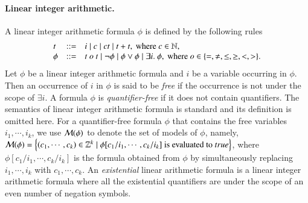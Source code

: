 \paragraph*{Linear integer arithmetic.}  A linear integer arithmetic formula $\phi$ is defined by the following rules
\[
\begin{array}{l c l}
t & ::=  & i \mid c \mid ct \mid t + t, \mbox{ where } c \in \mathbb{N}, \\
\phi &::= & t \ o \ t \mid \neg \phi \mid \phi \vee \phi \mid \exists i.\ \phi, \mbox{ where } o \in \{=, \neq, \le, \ge, <, >\}.
\end{array}
\]
Let $\phi$ be a linear integer arithmetic formula and $i$ be a variable occurring in $\phi$. Then an occurrence of $i$ in $\phi$ is said to be \emph{free}  if the occurrence is not under the scope of $\exists i$. A formula $\phi$ is \emph{quantifier-free} if it does not contain quantifiers. The semantics of linear integer arithmetic formula is standard and its definition is omitted here.
For a quantifier-free formula $\phi$ that contains the free variables $i_1, \cdots, i_k$, we use $\mathcal{M}(\phi)$ to denote the set of models of $\phi$, namely, $\mathcal{M}(\phi) = \left\{(c_1, \cdots ,c_k) \in \mathbb{Z}^k \mid \phi[c_1/i_1, \cdots, c_k/i_k] \mbox{ is evaluated to } true\right\}$, where $\phi[c_1/i_1, \cdots, c_k/i_k]$ is the formula obtained from $\phi$ by simultaneously replacing $i_1,\cdots, i_k$ with $c_1,\cdots, c_k$. An \emph{existential} linear arithmetic formula is a linear integer arithmetic formula where all the existential quantifiers are under the scope of an even number of negation symbols.
